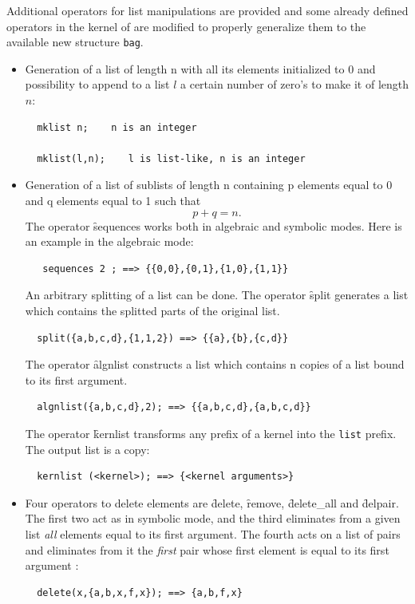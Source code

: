 Additional operators for list manipulations are provided and some already
defined operators in the kernel of \REDUCE are modified to properly
generalize them to the available new structure \texttt{bag}.
\begin{itemize}
\item[i.]
\hypertarget{operator:MKLIST}{}%
Generation of a list of length n with all its elements initialized to 0
and possibility to append to a list $l$ a certain number of
zero's to make it of length $n$:
\begin{verbatim}
  mklist n;    n is an integer

  mklist(l,n);    l is list-like, n is an integer
\end{verbatim}

\item[ii.]
\hypertarget{operator:SEQUENCES}{}%
Generation of a list of sublists of length n containing p elements
equal to 0 and q elements equal to 1 such that  \[p+q=n .\]
The operator \f{sequences} works both in algebraic and
symbolic modes.  Here is an example in the algebraic mode:
\begin{verbatim}
   sequences 2 ; ==> {{0,0},{0,1},{1,0},{1,1}}
\end{verbatim}
\hypertarget{operator:SPLIT}{}%
An arbitrary splitting of a list can be done. The operator \f{split}
generates a list which contains the splitted parts of the original list.
\begin{verbatim}
  split({a,b,c,d},{1,1,2}) ==> {{a},{b},{c,d}}
\end{verbatim}
\hypertarget{operator:ALGNLIST}{}%
The operator \f{algnlist} constructs a list which contains n copies
of a list bound to its first argument.
\begin{verbatim}
  algnlist({a,b,c,d},2); ==> {{a,b,c,d},{a,b,c,d}}
\end{verbatim}
\hypertarget{operator:KERNLIST}{}%
The operator \f{kernlist} transforms any prefix of a kernel into the
\texttt{list} prefix. The output list is a copy:
\begin{verbatim}
  kernlist (<kernel>); ==> {<kernel arguments>}
\end{verbatim}
\item[iii.]
\hypertarget{operator:DELETE}{}
\hypertarget{operator:DELETE_ALL}{}
\hypertarget{operator:DELPAIR}{}
\hypertarget{operator:REMOVE}{}
Four operators to delete elements are \f{delete}, \f{remove}, \f{delete\_all} and
\f{delpair}. The first two act as in symbolic mode, and the third
eliminates from a given list \emph{all}
elements equal to its first argument. The fourth acts on a list of pairs
and eliminates from it the \emph{first} pair whose first element is equal to
its first argument :
\begin{verbatim}
  delete(x,{a,b,x,f,x}); ==> {a,b,f,x}


\end{verbatim}
\end{itemize}
